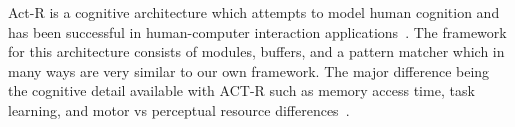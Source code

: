 Act-R is a cognitive architecture which attempts to model human cognition and
has been successful in human-computer interaction applications~\cite{anderson2004integrated,lebiere2013cognitive}.  The
framework for this architecture consists of modules, buffers, and a pattern
matcher which in many ways are very similar to our own framework.  The major
difference being the cognitive detail available with ACT-R such as memory access
time, task learning, and motor vs perceptual resource differences~\cite{moray1982subjective,newell1994unified}.
